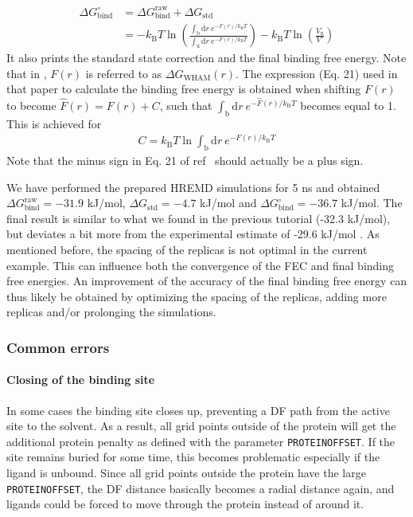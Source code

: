 \begin{equation}
  \begin{aligned}
    \Delta G_{\text{bind}}^{\circ} & = \Delta G_{\text{bind}}^{\text{raw}} + \Delta G_{\text{std}}  \\
                            & = -k_{\text{B}} T \ln \left ( \frac{\int_{\text{b}} \mathrm{d}r\: e^{-F(r)/k_{\text{B}} T}}{\int_{\text{u}} \mathrm{d}r\: e^{-F(r)/k_{\text{B}} T}} \right ) -k_{\text{B}} T \ln \left( \frac{V_{\text{u}}}{V^{\circ}} \right )
  \end{aligned}
\end{equation}
%
It also prints the standard state correction and the final binding free energy. 
Note that in \cite{deRuiter_2013}, $F(r)$ is referred to as $\Delta G_{\text{WHAM}}(r)$. The expression (Eq. 21) used in that paper to calculate the binding free energy is obtained when shifting $F(r)$ to become $\hat{F}(r) = F(r) + C$, such that $\int_{\text{b}} \mathrm{d}r\: e^{-\hat{F}(r)/k_{\text{B}} T}$ becomes equal to 1. This is achieved for 
\begin{equation}
  \begin{aligned}
    C = k_{\text{B}}T \ln \int_{\text{b}} \mathrm{d}r\: e^{-F(r)/k_{\text{B}} T}
  \end{aligned}
\end{equation}
Note that the minus sign in Eq. 21 of ref~\cite{deRuiter_2013} should actually be a plus sign.

We have performed the prepared HREMD simulations for 5 ns and obtained $\Delta G^{\text{raw}}_{\text{bind}}=-31.9$ kJ/mol, $\Delta G_{\text{std}}=-4.7$ kJ/mol and $\Delta G^{\circ}_{\text{bind}}=-36.7$ kJ/mol. The final result is similar to what we found in the previous tutorial (-32.3 kJ/mol), but deviates a bit more from the experimental estimate of -29.6 kJ/mol \cite{Singh2005}.
As mentioned before, the spacing of the replicas is not optimal in the current example. 
This can influence both the convergence of the FEC and final binding free energies.
An improvement of the accuracy of the final binding free energy can thus likely be obtained by optimizing the spacing of the replicas, adding more replicas and/or prolonging the simulations.

\subsubsection{Common errors}

\paragraph{Closing of the binding site}
In some cases the binding site closes up, preventing a DF path from the active site to the solvent. As a result, all grid points outside of the protein will get the additional protein penalty as defined with the parameter \texttt{PROTEINOFFSET}. If the site remains buried for some time, this becomes problematic especially if the ligand is unbound. Since all grid points outside the protein have the large \texttt{PROTEINOFFSET}, the DF distance basically becomes a radial distance again, and ligands could be forced to move through the protein instead of around it.

